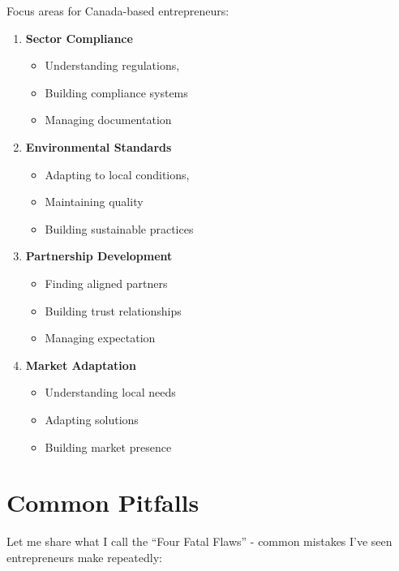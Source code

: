 Focus areas for Canada-based entrepreneurs:

\begin{enumerate}
    \item \textbf{Sector Compliance}
    \begin{itemize}
        \item Understanding regulations,
        \item Building compliance systems
        \item Managing documentation
    \end{itemize}

    \item \textbf{Environmental Standards}
    \begin{itemize}
        \item Adapting to local conditions,
        \item Maintaining quality
        \item Building sustainable practices
    \end{itemize}

    \item \textbf{Partnership Development}
    \begin{itemize}
        \item Finding aligned partners
        \item Building trust relationships
        \item Managing expectation
    \end{itemize}

    \item \textbf{Market Adaptation}
    \begin{itemize}
        \item Understanding local needs
        \item Adapting solutions
        \item Building market presence
    \end{itemize}
\end{enumerate}

\section{Common Pitfalls}\label{sec:common-pitfalls}

Let me share what I call the ``Four Fatal Flaws'' - common mistakes I've seen entrepreneurs make repeatedly:

